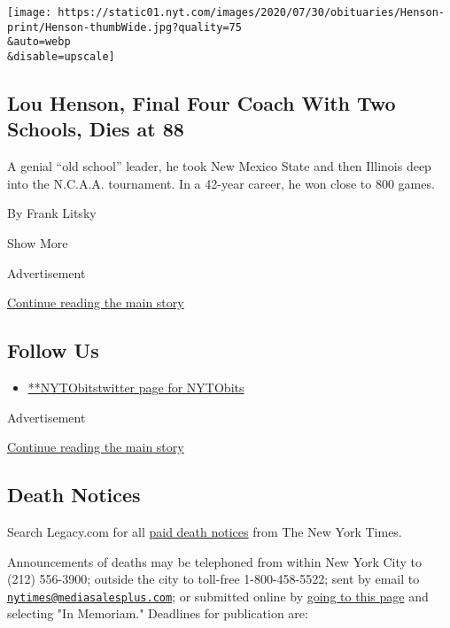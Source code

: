 \begin{enumerate}
  \texttt{[image: https://static01.nyt.com/images/2020/07/30/obituaries/Henson-print/Henson-thumbWide.jpg?quality=75\\\&auto=webp\\\&disable=upscale]}

  \hypertarget{lou-henson-final-four-coach-with-two-schools-dies-at-88}{%
  \subsection{Lou Henson, Final Four Coach With Two Schools, Dies at
  88}\label{lou-henson-final-four-coach-with-two-schools-dies-at-88}}

  A genial ``old school'' leader, he took New Mexico State and then
  Illinois deep into the N.C.A.A. tournament. In a 42-year career, he
  won close to 800 games.

  By Frank Litsky
\end{enumerate}

Show More

Advertisement

\protect\hyperlink{after-mid3}{Continue reading the main story}

\hypertarget{follow-us}{%
\subsection{Follow Us}\label{follow-us}}

\begin{itemize}
\tightlist
\item
  \href{https://twitter.com/NYTObits}{**NYTObitstwitter page for
  NYTObits}
\end{itemize}

Advertisement

\protect\hyperlink{after-mktg}{Continue reading the main story}

\hypertarget{death-notices}{%
\subsection{Death Notices}\label{death-notices}}

Search Legacy.com for all \href{https://www.legacy.com/NYTimes/}{paid
death notices} from The New York Times.

Announcements of deaths may be telephoned from within New York City to
(212) 556-3900; outside the city to toll-free 1-800-458-5522; sent by
email to
\href{mailto:nytimes@mediasalesplus.com}{\nolinkurl{nytimes@mediasalesplus.com}};
or submitted online by
\href{https://advertising.nytimes.com/irj/go/nyt/prtroot/fwk/classified}{going
to this page} and selecting "In Memoriam." Deadlines for publication
are:

